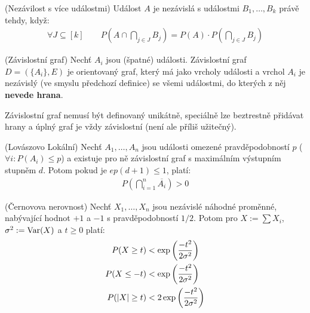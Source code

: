 \df (Nezávilost s více událostmi) Událost $A$ je nezávislá s událostmi {$B_1,
\dots, B_k$} právě tehdy, když:
\begin{align}
	\forall J \subseteq [k] \qquad P\left(A\cap\bigcap_{j\in J} B_j\right) =
	P(A) \cdot P\left(\bigcap_{j \in J} B_j\right)
\end{align}

\df (Závislostní graf) Nechť $A_i$ jsou (špatné) události. Závislostní graf $D =
(\{A_i\}, E)$ je orientovaný graf, který má jako vrcholy události a vrchol $A_i$
je nezávislý (ve smyslu předchozí definice) se všemi událostmi, do kterých z něj
{\bf nevede hrana}.

\poz Závislostní graf nemusí být definovaný unikátně, speciálně lze beztrestně
přidávat hrany a úplný graf je vždy závislostní (není ale příliš užitečný).

\lm (Lovászovo Lokální) Nechť $A_1, \dots, A_n$ jsou události omezené
pravděpodobností $p$ ($\forall i: P(A_i) \leq p$) a existuje pro ně závislostní
graf s maximálním výstupním stupněm $d$. Potom pokud je $ep(d+1) \leq 1$, platí:
\begin{align}
	P\left(\bigcap_{i=1}^n \overline{A_i}\right) > 0
\end{align}

\vt (Černovova nerovnost) Nechť $X_1, \dots, X_n$ jsou nezávislé náhodné
proměnné, nabývající hodnot $+1$ a $-1$ s pravděpodobností $1/2$. Potom pro $X
:= \sum X_i$, $\sigma^2 := \operatorname{Var}(X)$ a $t \geq 0$ platí:
\begin{align}
	P(X \geq t) &< \exp\left({-t^2 \over 2 \sigma^2}\right) \\
	P(X \leq -t) &< \exp\left({-t^2 \over 2 \sigma^2}\right) \\
	P(|X| \geq t) & < 2\exp\left({-t^2 \over 2 \sigma^2}\right)
\end{align}

